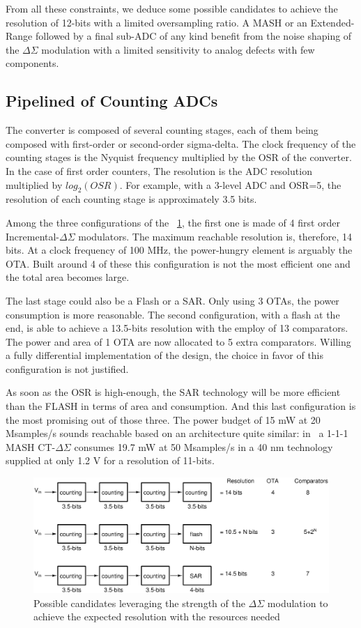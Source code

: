 From all these constraints, we deduce some possible candidates to achieve the resolution of 12-bits with a limited oversampling ratio.
A MASH or an Extended-Range followed by a final sub-ADC of any kind benefit from the noise shaping of the $\Delta\Sigma$ modulation with a limited sensitivity to analog defects with few components.

\subsection{Pipelined of Counting ADCs}
The converter is composed of several counting stages, each of them being composed with first-order or second-order sigma-delta. The clock frequency of the
counting stages is the Nyquist frequency multiplied by the OSR of the converter. In the case of first order counters, The resolution is the ADC resolution multiplied by \(log_2(OSR)\). For example, with a 3-level ADC and OSR=5, the resolution of each counting stage is approximately 3.5 bits.

Among the three configurations of the \figurename~\ref{fig:counting-candidates}, the first one is made of 4 first order Incremental-\(\Delta \Sigma\) modulators. The maximum reachable resolution is, therefore, 14 bits. At a clock frequency of 100 MHz, the power-hungry element is arguably the OTA\@. Built around 4 of these this configuration is not the most efficient one and the total area becomes large.

The last stage could also be a Flash or a SAR\@. Only using 3 OTAs, the power consumption is more reasonable. The second configuration, with a flash at the end, is able to achieve a 13.5-bits resolution with the employ of 13 comparators. The power and area of 1 OTA are now allocated to 5 extra comparators. Willing a fully differential implementation of the design, the choice in favor of this configuration is not justified.

As soon as the OSR is high-enough, the SAR technology will be more efficient than the FLASH in terms of area and consumption. And this last configuration is the most promising out of those three. The power budget of 15 mW at 20 Msamples/s sounds reachable based on an architecture quite similar: in~\cite{Liu2017} a 1-1-1 MASH CT-\(\Delta\Sigma\) consumes 19.7 mW at 50 Msamples/s in a 40 nm technology supplied at only 1.2 V for a resolution of 11-bits.

\begin{figure}[htp]
	\centering
	\includegraphics[width=.9\textwidth]{Chapter4/Figs/study/counting-conversion.ps}
	\caption{Possible candidates leveraging the strength of the \(\Delta \Sigma\) modulation to achieve the expected resolution with the resources needed}
	\label{fig:counting-candidates}
\end{figure}

